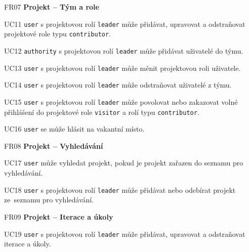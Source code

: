 \begin{dlnar}
   \item[FR07] \textbf{Projekt -- Tým a role}
 
   \begin{dlnar}

      \item[UC11] 
      \texttt{user} s projektovou rolí \texttt{leader} může přidávat, upravovat a odstraňovat projektové role typu \texttt{contributor}.

      \item[UC12]
      \texttt{authority} s projektovou rolí \texttt{leader} může přidávat uživatelé do týmu.

      \item[UC13] 
      \texttt{user} s projektovou rolí \texttt{leader} může měnit projektovou roli uživatele.

      \item[UC14]
      \texttt{user} s projektovou rolí \texttt{leader} může odstraňovat uživatelé z týmu.

      \item[UC15] 
      \texttt{user} s projektovou rolí \texttt{leader} může povolovat nebo zakazovat volné přihlášení do projektové role \texttt{visitor} a rolí typu \texttt{contributor}.

      \item[UC16]
      \texttt{user} se může hlásit na vakantní místo.
   \end{dlnar}
\end{dlnar}


\begin{dlnar}
   \item[FR08] \textbf{Projekt -- Vyhledávání}
   
   \begin{dlnar}
      \item[UC17] 
      \texttt{user} může vyhledat projekt, pokud je projekt zařazen do seznamu pro vyhledávání.

      \item[UC18]
      \texttt{user} s projektovou rolí \texttt{leader} může přidávat nebo odebírat projekt ze~seznamu pro vyhledávání.
   \end{dlnar}
\end{dlnar}


\begin{dlnar}
   \item[FR09] \textbf{Projekt -- Iterace a úkoly}
   
   \begin{dlnar}
      \item[UC19] 
      \texttt{user} s projektovou rolí \texttt{leader} může přidávat, upravovat a odstraňovat iterace a úkoly.
   \end{dlnar}
\end{dlnar}


